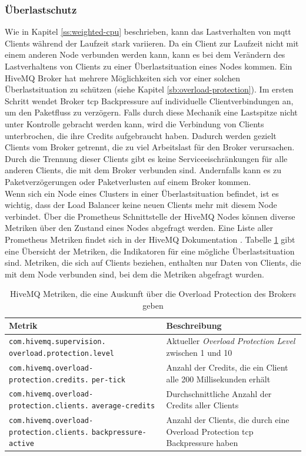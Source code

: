 \subsubsection{Überlastschutz} \label{ss:circuit-breaking}
Wie in Kapitel \ref{ss:weighted-cpu} beschrieben, kann das Lastverhalten von \ac{mqtt} Clients während der Laufzeit stark variieren. Da ein Client zur Laufzeit nicht mit einem anderen Node verbunden werden kann, kann es bei dem Verändern des Lastverhaltens von Clients zu einer Überlastsituation eines Nodes kommen.
Ein HiveMQ Broker hat mehrere Möglichkeiten sich vor einer solchen Überlastsituation zu schützen (siehe Kapitel \ref{sb:overload-protection}).
Im ersten Schritt wendet Broker \ac{tcp} Backpressure auf individuelle Clientverbindungen an, um den Paketfluss zu verzögern.
Falls durch diese Mechanik eine Lastspitze nicht unter Kontrolle gebracht werden kann, wird die Verbindung von Clients unterbrochen, die ihre Credits aufgebraucht haben.
Dadurch werden gezielt Clients vom Broker getrennt, die zu viel Arbeitslast für den Broker verursachen.
Durch die Trennung dieser Clients gibt es keine Serviceeischränkungen für alle anderen Clients, die mit dem Broker verbunden sind. Andernfalls kann es zu Paketverzögerungen oder Paketverlusten auf einem Broker kommen.
\\
Wenn sich ein Node eines Clusters in einer Überlastsituation befindet, ist es wichtig, dass der Load Balancer keine neuen Clients mehr mit diesem Node verbindet.
Über die Prometheus Schnittstelle der HiveMQ Nodes können diverse Metriken über den Zustand eines Nodes abgefragt werden.
Eine Liste aller Prometheus Metriken findet sich in der HiveMQ Dokumentation \cite{MonitoringHiveMQDocumentation}.
Tabelle \ref{table:overload-protection-metrics} gibt eine Übersicht der Metriken, die Indikatoren für eine mögliche Überlastsituation sind. Metriken, die sich auf Clients beziehen, enthalten nur Daten von Clients, die mit dem Node verbunden sind, bei dem die Metriken abgefragt wurden.
\begin{table}[htbp]
\centering
\renewcommand{\arraystretch}{1.5}
\begin{tabularx}{\textwidth}{|p{5cm}|X|}
    \hline
    \textbf{Metrik} & \textbf{Beschreibung} \\
    \hline
    \hline
    \verb|com.hivemq.supervision.| \verb|overload.protection.level| & Aktueller \textit{Overload Protection Level} zwischen 1 und 10 \\
    \hline
    \verb|com.hivemq.overload-| \verb|protection.credits.| \verb|per-tick| & Anzahl der Credits, die ein Client alle 200 Millisekunden erhält \\
    \hline
    \verb|com.hivemq.overload-| \verb|protection.clients.| \verb|average-credits| & Durchschnittliche Anzahl der Credits aller Clients \\
    \hline
    \verb|com.hivemq.overload-| \verb|protection.clients.| \verb|backpressure-active| & Anzahl der Clients, die durch eine Overload Protection \ac{tcp} Backpressure haben \\
    \hline
\end{tabularx}
\caption{HiveMQ Metriken, die eine Auskunft über die Overload Protection des Brokers geben}
\label{table:overload-protection-metrics}
\end{table}
